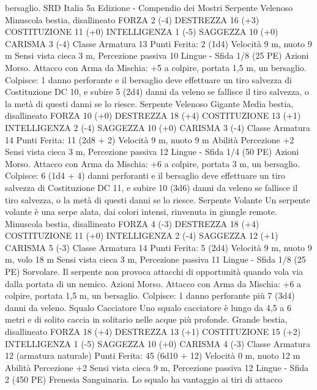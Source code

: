 \begin{multicols}{2}
bersaglio.
SRD Italia 5a Edizione - Compendio dei Mostri
Serpente Velenoso
Minuscola bestia, disallineato
FORZA 2 (-4)
DESTREZZA 16 (+3)
COSTITUZIONE 11 (+0)
INTELLIGENZA 1 (-5)
SAGGEZZA 10 (+0)
CARISMA 3 (-4)
Classe Armatura 13
\hspace*{0pt}\hfill{Punti Ferita}: 2 (1d4)
Velocità 9 m, nuoto 9 m
Sensi vista cieca 3 m, Percezione passiva 10
Lingue -
Sfida 1/8 (25 PE)
Azioni
Morso. Attacco con Arma da Mischia: +5 a colpire, portata 1,5
m, un bersaglio.
Colpisce: 1 danno perforante e il bersaglio deve effettuare un tiro
salvezza di Costituzione DC 10, e subire 5 (2d4) danni da veleno
se fallisce il tiro salvezza, o la metà di questi danni se lo riesce.
Serpente Velenoso
Gigante
Media bestia, disallineato
FORZA 10 (+0)
DESTREZZA 18 (+4)
COSTITUZIONE 13 (+1)
INTELLIGENZA 2 (-4)
SAGGEZZA 10 (+0)
CARISMA 3 (-4)
Classe Armatura 14
\hspace*{0pt}\hfill{Punti Ferita}: 11 (2d8 + 2)
Velocità 9 m, nuoto 9 m
Abilità Percezione +2
Sensi vista cieca 3 m, Percezione passiva 12
Lingue -
Sfida 1/4 (50 PE)
Azioni
Morso. Attacco con Arma da Mischia: +6 a colpire, portata 3 m,
un bersaglio.
Colpisce: 6 (1d4 + 4) danni perforanti e il bersaglio deve
effettuare un tiro salvezza di Costituzione DC 11, e subire 10
(3d6) danni da veleno se fallisce il tiro salvezza, o la metà di
questi danni se lo riesce.
Serpente Volante
Un serpente volante è una serpe alata, dai colori
intensi, rinvenuta in giungle remote.
Minuscola bestia, disallineato
FORZA 4 (-3)
DESTREZZA 18 (+4)
COSTITUZIONE 11 (+0)
INTELLIGENZA 2 (-4)
SAGGEZZA 12 (+1)
CARISMA 5 (-3)
Classe Armatura 14
\hspace*{0pt}\hfill{Punti Ferita}: 5 (2d4)
Velocità 9 m, nuoto 9 m, volo 18 m
Sensi vista cieca 3 m, Percezione passiva 11
Lingue -
Sfida 1/8 (25 PE)
Sorvolare. Il serpente non provoca attacchi di opportunità
quando vola via dalla portata di un nemico.
Azioni
Morso. Attacco con Arma da Mischia: +6 a colpire, portata 1,5
m, un bersaglio.
Colpisce: 1 danno perforante più 7 (3d4) danni da veleno.
Squalo Cacciatore
Uno squalo cacciatore è lungo da 4,5 a 6 metri e di
solito caccia in solitario nelle acque più profonde.
Grande bestia, disallineato
FORZA 18 (+4)
DESTREZZA 13 (+1)
COSTITUZIONE 15 (+2)
INTELLIGENZA 1 (-5)
SAGGEZZA 10 (+0)
CARISMA 4 (-3)
Classe Armatura 12 (armatura naturale)
\hspace*{0pt}\hfill{Punti Ferita}: 45 (6d10 + 12)
Velocità 0 m, nuoto 12 m
Abilità Percezione +2
Sensi vista cieca 9 m, Percezione passiva 12
Lingue -
Sfida 2 (450 PE)
Frenesia Sanguinaria. Lo squalo ha vantaggio ai tiri di attacco

\end{multicols}
